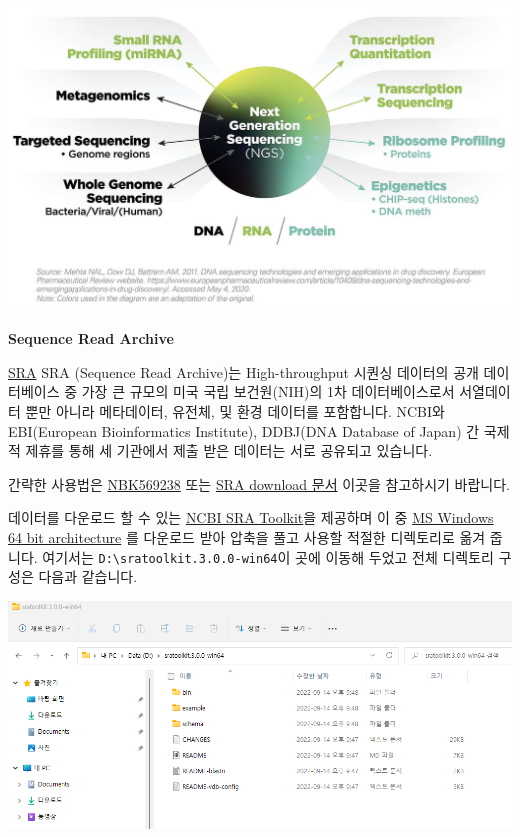 \documentclass[
]{book}
\begin{document}
\includegraphics[width=6.25in,height=\textheight]{images/12/ngs.png}

\textbf{Sequence Read Archive}

\href{https://www.ncbi.nlm.nih.gov/sra}{SRA} SRA (Sequence Read Archive)는 High-throughput 시퀀싱 데이터의 공개 데이터베이스 중 가장 큰 규모의 미국 국립 보건원(NIH)의 1차 데이터베이스로서 서열데이터 뿐만 아니라 메타데이터, 유전체, 및 환경 데이터를 포함합니다. NCBI와 EBI(European Bioinformatics Institute), DDBJ(DNA Database of Japan) 간 국제적 제휴를 통해 세 기관에서 제출 받은 데이터는 서로 공유되고 있습니다.

간략한 사용법은 \href{https://www.ncbi.nlm.nih.gov/books/NBK569238/}{NBK569238} 또는 \href{https://www.ncbi.nlm.nih.gov/sra/docs/sradownload/}{SRA download 문서} 이곳을 참고하시기 바랍니다.

데이터를 다운로드 할 수 있는 \href{https://github.com/ncbi/sra-tools/wiki/01.-Downloading-SRA-Toolkit}{NCBI SRA Toolkit}을 제공하며 이 중 \href{https://ftp-trace.ncbi.nlm.nih.gov/sra/sdk/3.0.0/sratoolkit.3.0.0-win64.zip}{MS Windows 64 bit architecture} 를 다운로드 받아 압축을 풀고 사용할 적절한 디렉토리로 옮겨 줍니다. 여기서는 \texttt{D:\textbackslash{}sratoolkit.3.0.0-win64}이 곳에 이동해 두었고 전체 디렉토리 구성은 다음과 같습니다.

\includegraphics[width=6.25in,height=\textheight]{images/12/env0.png}
\end{document}
